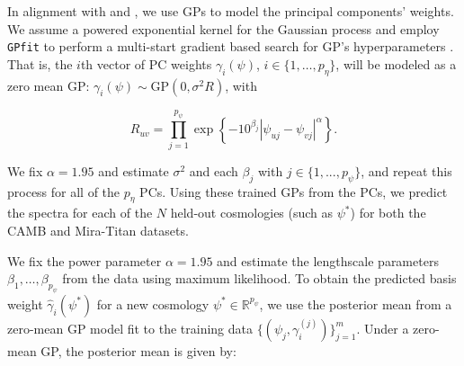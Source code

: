 \documentclass[11pt]{article}
\begin{document}

In alignment with \cite{higdon2010estcosmo} and \cite{moran2023mira}, we use 
GPs to model the principal components' weights. 
We assume a powered exponential kernel for the Gaussian process and employ 
\texttt{GPfit} to perform a multi-start gradient based search for GP's hyperparameters 
\citep{macdonald2015gpfit}. That is, the $i$th vector of PC weights $\gamma_i(\psi)$, 
$i \in \{1,\ldots,p_\eta\}$, will be modeled as a zero mean GP: 
$\gamma_i(\psi) \sim \mathrm{GP}(0, \sigma^2R)$, with

\begin{equation*}
    R_{uv} = \prod_{j=1}^{p_\psi}\exp\left\{-10^{\beta_j}|\psi_{uj}-\psi_{vj}|^\alpha\right\}.
\end{equation*}

We fix $\alpha=1.95$ and estimate $\sigma^2$ and each $\beta_j$ with $j \in \{1,...,p_\psi\}$, and repeat this
process for all of the $p_\eta$ PCs. Using these trained GPs from the PCs, we predict the spectra for 
each of the $N$ held-out cosmologies (such as $\psi^*$) for both the CAMB and Mira-Titan datasets. 

We fix the power parameter $\alpha = 1.95$ and estimate the lengthscale parameters $\beta_1, \ldots, \beta_{p_\psi}$ 
from the data using maximum likelihood. To obtain the predicted basis weight $\hat{\gamma}_i(\psi^*)$ 
for a new cosmology $\psi^* \in \mathbb{R}^{p_\psi}$, 
we use the posterior mean from a zero-mean GP model fit to the training data 
$\{(\psi_j, \gamma_i^{(j)})\}_{j=1}^m$. Under a zero-mean GP, the posterior mean is given by:
\end{document}
